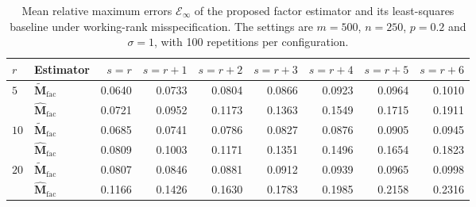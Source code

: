 \documentclass[numsec,webpdf,modern,large,namedate]{oup-authoring-template}
\theoremstyle{plain}
\theoremstyle{remark}
\newcommand{\M}{\bm{M}}
\begin{document}
\begin{table}[!htbp]
\centering
\caption{Mean relative maximum errors $\mathcal E_\infty$ of the proposed factor estimator and its least-squares baseline under working-rank misspecification. The settings are $m=500$, $n=250$, $p=0.2$ and $\sigma=1$, with 100 repetitions per configuration.}
\label{tab:supp:misrank_maxnorm}
\begingroup
\small
{}
\setlength{\tabcolsep}{3.2pt}
\begin{tabular}{@{}llrrrrrrr@{}}
\toprule
$r$ & Estimator & $s=r$ & $s=r+1$ & $s=r+2$ & $s=r+3$ & $s=r+4$ & $s=r+5$ & $s=r+6$ \\
\midrule
\multirow{2}{*}{$5$} & $\widetilde{\M}_{\mathrm{fac}}$ & 0.0640 & 0.0733 & 0.0804 & 0.0866 & 0.0923 & 0.0964 & 0.1010 \\
 & $\widehat{\M}_{\mathrm{fac}}$ & 0.0721 & 0.0952 & 0.1173 & 0.1363 & 0.1549 & 0.1715 & 0.1911 \\
\midrule
\multirow{2}{*}{$10$} & $\widetilde{\M}_{\mathrm{fac}}$ & 0.0685 & 0.0741 & 0.0786 & 0.0827 & 0.0876 & 0.0905 & 0.0945 \\
 & $\widehat{\M}_{\mathrm{fac}}$ & 0.0809 & 0.1003 & 0.1171 & 0.1351 & 0.1496 & 0.1654 & 0.1823 \\
\midrule
\multirow{2}{*}{$20$} & $\widetilde{\M}_{\mathrm{fac}}$ & 0.0807 & 0.0846 & 0.0881 & 0.0912 & 0.0939 & 0.0965 & 0.0998 \\
 & $\widehat{\M}_{\mathrm{fac}}$ & 0.1166 & 0.1426 & 0.1630 & 0.1783 & 0.1985 & 0.2158 & 0.2316 \\
\bottomrule
\end{tabular}
\endgroup
\end{table}



\end{document}
